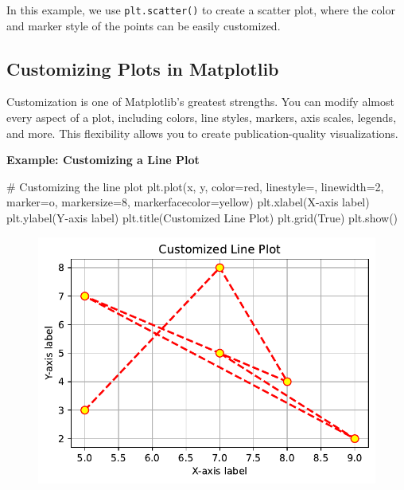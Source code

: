 \documentclass[
  letterpaper,
  DIV=11,
  numbers=noendperiod]{scrreprt}
\newenvironment{Shaded}{\begin{snugshade}}{\end{snugshade}}
\newcommand{\CommentTok}[1]{\textcolor[rgb]{0.37,0.37,0.37}{#1}}
\newcommand{\DecValTok}[1]{\textcolor[rgb]{0.68,0.00,0.00}{#1}}
\newcommand{\NormalTok}[1]{\textcolor[rgb]{0.00,0.23,0.31}{#1}}
\newcommand{\OperatorTok}[1]{\textcolor[rgb]{0.37,0.37,0.37}{#1}}
\newcommand{\StringTok}[1]{\textcolor[rgb]{0.13,0.47,0.30}{#1}}
\newcommand{\VariableTok}[1]{\textcolor[rgb]{0.07,0.07,0.07}{#1}}
\begin{document}
In this example, we use \texttt{plt.scatter()} to create a scatter plot,
where the color and marker style of the points can be easily customized.

\hypertarget{customizing-plots-in-matplotlib}{%
\subsection{Customizing Plots in
Matplotlib}\label{customizing-plots-in-matplotlib}}

Customization is one of Matplotlib's greatest strengths. You can modify
almost every aspect of a plot, including colors, line styles, markers,
axis scales, legends, and more. This flexibility allows you to create
publication-quality visualizations.

\textbf{Example: Customizing a Line Plot}

\begin{Shaded}
\begin{Highlighting}[]
\CommentTok{\# Customizing the line plot}
\NormalTok{plt.plot(x, y, color}\OperatorTok{=}\StringTok{\textquotesingle{}red\textquotesingle{}}\NormalTok{, linestyle}\OperatorTok{=}\StringTok{\textquotesingle{}{-}{-}\textquotesingle{}}\NormalTok{, linewidth}\OperatorTok{=}\DecValTok{2}\NormalTok{, marker}\OperatorTok{=}\StringTok{\textquotesingle{}o\textquotesingle{}}\NormalTok{, markersize}\OperatorTok{=}\DecValTok{8}\NormalTok{, markerfacecolor}\OperatorTok{=}\StringTok{\textquotesingle{}yellow\textquotesingle{}}\NormalTok{)}
\NormalTok{plt.xlabel(}\StringTok{\textquotesingle{}X{-}axis label\textquotesingle{}}\NormalTok{)}
\NormalTok{plt.ylabel(}\StringTok{\textquotesingle{}Y{-}axis label\textquotesingle{}}\NormalTok{)}
\NormalTok{plt.title(}\StringTok{\textquotesingle{}Customized Line Plot\textquotesingle{}}\NormalTok{)}
\NormalTok{plt.grid(}\VariableTok{True}\NormalTok{)}
\NormalTok{plt.show()}
\end{Highlighting}
\end{Shaded}

\begin{figure}[H]

{\centering \includegraphics{15_Data_Vis_files/figure-pdf/cell-5-output-1.pdf}

}

\end{figure}
\end{document}
